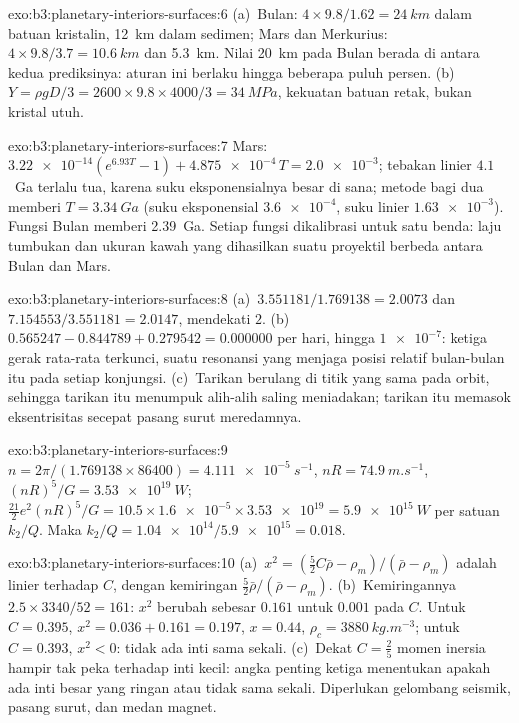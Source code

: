 \begin{solution}{exo:b3:planetary-interiors-surfaces:6}
(a)~Bulan: $4\times9.8/1.62 = \qty{24}{km}$ dalam batuan kristalin,
\qty{12}{km} dalam sedimen; Mars dan Merkurius: $4\times9.8/3.7 =
\qty{10.6}{km}$ dan \qty{5.3}{km}. Nilai \qty{20}{km} pada Bulan berada di antara
kedua prediksinya: aturan ini berlaku hingga beberapa puluh persen. (b)~$Y =
\rho gD/3 = 2600\times9.8\times4000/3 = \qty{34}{MPa}$, kekuatan
batuan retak, bukan kristal utuh.
\end{solution}

\begin{solution}{exo:b3:planetary-interiors-surfaces:7}
Mars: $\num{3.22e-14}(e^{6.93T} - 1) + \num{4.875e-4}\,T = \num{2.0e-3}$;
tebakan linier $4.1$~Ga terlalu tua, karena suku eksponensialnya besar
di sana; metode bagi dua memberi $T = \qty{3.34}{Ga}$ (suku eksponensial
$\num{3.6e-4}$, suku linier $\num{1.63e-3}$). Fungsi Bulan memberi
\qty{2.39}{Ga}. Setiap fungsi dikalibrasi untuk satu benda: laju
tumbukan dan ukuran kawah yang dihasilkan suatu proyektil
berbeda antara Bulan dan Mars.
\end{solution}

\begin{solution}{exo:b3:planetary-interiors-surfaces:8}
(a)~$3.551181/1.769138 = 2.0073$ dan $7.154553/3.551181 = 2.0147$, mendekati
$2$. (b)~$0.565247 - 0.844789 + 0.279542 = 0.000000$ per hari, hingga
$\num{1e-7}$: ketiga gerak rata-rata terkunci, suatu resonansi yang menjaga
posisi relatif bulan-bulan itu pada setiap konjungsi. (c)~Tarikan berulang di
titik yang sama pada orbit, sehingga tarikan itu menumpuk alih-alih saling meniadakan;
tarikan itu memasok eksentrisitas secepat pasang surut meredamnya.
\end{solution}

\begin{solution}{exo:b3:planetary-interiors-surfaces:9}
$n = 2\pi/(1.769138\times86400) = \qty{4.111e-5}{s^{-1}}$, $nR =
\qty{74.9}{m.s^{-1}}$, $(nR)^5/G = \qty{3.53e19}{W}$;
$\tfrac{21}{2}e^2(nR)^5/G = 10.5\times\num{1.6e-5}\times\num{3.53e19} =
\qty{5.9e15}{W}$ per satuan $k_2/Q$. Maka $k_2/Q =
\num{1.04e14}/\num{5.9e15} = 0.018$.
\end{solution}

\begin{solution}{exo:b3:planetary-interiors-surfaces:10}
(a)~$x^2 = (\tfrac52C\bar\rho - \rho_m)/(\bar\rho - \rho_m)$ adalah linier terhadap
$C$, dengan kemiringan $\tfrac52\bar\rho/(\bar\rho - \rho_m)$. (b)~Kemiringannya
$2.5\times3340/52 = 161$: $x^2$ berubah sebesar $0.161$ untuk $0.001$ pada $C$.
Untuk $C = 0.395$, $x^2 = 0.036 + 0.161 = 0.197$, $x = 0.44$, $\rho_c =
\qty{3880}{kg.m^{-3}}$; untuk $C = 0.393$, $x^2 < 0$: tidak ada inti sama sekali.
(c)~Dekat $C = \tfrac25$ momen inersia hampir tak peka terhadap inti kecil:
angka penting ketiga menentukan apakah ada inti besar yang ringan atau tidak sama sekali.
Diperlukan gelombang seismik, pasang surut, dan medan magnet.
\end{solution}


